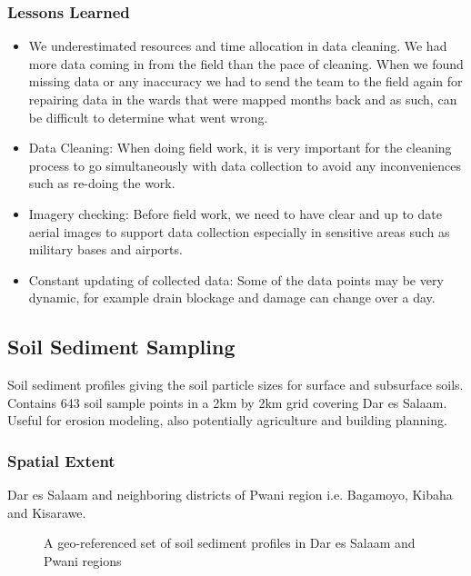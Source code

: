\documentclass[a4paper,12pt,twoside]{article}
\begin{document}
\subsubsection{Lessons Learned}
\begin{itemize}
    
\item {\color {RHblue}{Field work outpacing data cleaning and analysis:}}
We underestimated resources and time allocation in data cleaning. We had more data coming in from the field than the pace of cleaning. When we found missing data or any inaccuracy we had to send the team to the field again for repairing data in the wards that were mapped months back and as such, can be difficult to determine what went wrong. 
\item {\color {RHblue} {Data Cleaning:}}
When doing field work, it is very important for the cleaning process to go simultaneously with data collection to avoid any inconveniences such as re-doing the work.
\item{\color {RHblue} {Imagery checking:}}
Before field work, we need to have clear and up to date aerial images to support data collection especially in sensitive areas such as military bases and airports.
\item {\color {RHblue} {Constant updating of collected data:}} Some of the data points may be very dynamic, for example drain blockage and damage can change over a day.
\end{itemize}
\newpage
\subsection{Soil Sediment Sampling}

Soil sediment profiles giving the soil particle sizes for surface and subsurface soils. Contains 643 soil sample points in a 2km by 2km grid covering Dar es Salaam.
Useful for erosion modeling, also potentially agriculture and building planning. 

\subsubsection{Spatial Extent}
Dar es Salaam and neighboring districts of Pwani region i.e. Bagamoyo, Kibaha and Kisarawe.

\begin{figure}[h]
  {\color{RHblue}\caption{A geo-referenced set of soil sediment profiles in Dar es Salaam and Pwani regions}}
  \centering
\end{figure}
\end{document}
